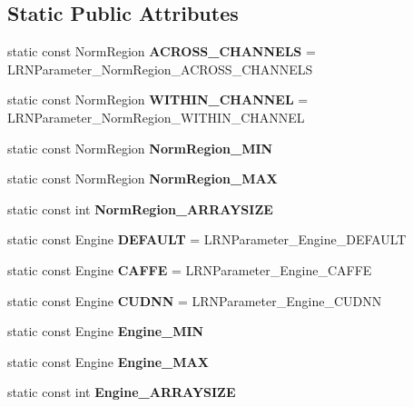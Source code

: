 \subsection*{Static Public Attributes}
\begin{DoxyCompactItemize}
\item 
\mbox{\label{classcaffe_1_1_l_r_n_parameter_a23fbaf2a411dd00d0d7d1b0fc16622c4}} 
static const Norm\+Region {\bfseries A\+C\+R\+O\+S\+S\+\_\+\+C\+H\+A\+N\+N\+E\+LS} = L\+R\+N\+Parameter\+\_\+\+Norm\+Region\+\_\+\+A\+C\+R\+O\+S\+S\+\_\+\+C\+H\+A\+N\+N\+E\+LS
\item 
\mbox{\label{classcaffe_1_1_l_r_n_parameter_a0c311045d978c5878d80b1442100dcd8}} 
static const Norm\+Region {\bfseries W\+I\+T\+H\+I\+N\+\_\+\+C\+H\+A\+N\+N\+EL} = L\+R\+N\+Parameter\+\_\+\+Norm\+Region\+\_\+\+W\+I\+T\+H\+I\+N\+\_\+\+C\+H\+A\+N\+N\+EL
\item 
static const Norm\+Region {\bfseries Norm\+Region\+\_\+\+M\+IN}
\item 
static const Norm\+Region {\bfseries Norm\+Region\+\_\+\+M\+AX}
\item 
static const int {\bfseries Norm\+Region\+\_\+\+A\+R\+R\+A\+Y\+S\+I\+ZE}
\item 
\mbox{\label{classcaffe_1_1_l_r_n_parameter_abad81bb9c6c6154408ba9dc0ddccb892}} 
static const Engine {\bfseries D\+E\+F\+A\+U\+LT} = L\+R\+N\+Parameter\+\_\+\+Engine\+\_\+\+D\+E\+F\+A\+U\+LT
\item 
\mbox{\label{classcaffe_1_1_l_r_n_parameter_ae9f28b064ddd4786bbf66ed470c2fc2c}} 
static const Engine {\bfseries C\+A\+F\+FE} = L\+R\+N\+Parameter\+\_\+\+Engine\+\_\+\+C\+A\+F\+FE
\item 
\mbox{\label{classcaffe_1_1_l_r_n_parameter_a43293ebeb0d4f8713c0c38bc67e15724}} 
static const Engine {\bfseries C\+U\+D\+NN} = L\+R\+N\+Parameter\+\_\+\+Engine\+\_\+\+C\+U\+D\+NN
\item 
static const Engine {\bfseries Engine\+\_\+\+M\+IN}
\item 
static const Engine {\bfseries Engine\+\_\+\+M\+AX}
\item 
static const int {\bfseries Engine\+\_\+\+A\+R\+R\+A\+Y\+S\+I\+ZE}

\end{DoxyCompactItemize}
